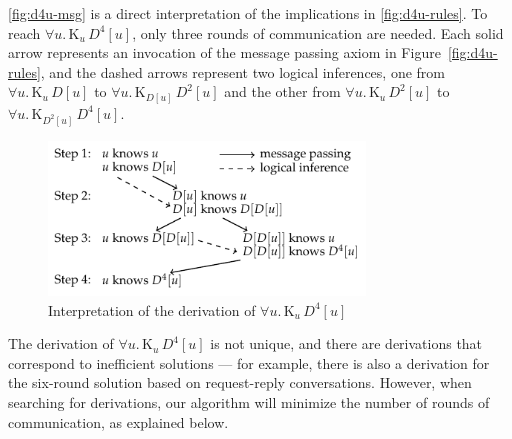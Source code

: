 \documentclass{sokendai_thesis} %
\newcommand{\knows}[2]{\mathrm K_{#1}\,{#2}}
\begin{document}
\autoref{fig:d4u-msg} is a direct interpretation of the implications in \autoref{fig:d4u-rules}.
To reach $\forall u.\,\knows{u}{D^4[u]}$, only three rounds of communication are needed.
Each solid arrow represents an invocation of the message passing axiom in Figure~\ref{fig:d4u-rules}, and the dashed arrows represent two logical inferences, one from $\forall u.\,\knows{u}{D[u]}$ to $\forall u.\,\knows{D[u]}{D^2[u]}$ and the other from $\forall u.\,\knows{u}{D^2[u]}$ to $\forall u.\,\knows{D^2[u]}{D^4[u]}$.

\begin{figure}[t]
 \centering
 \includegraphics[width=0.75\textwidth]{figures/d4u.pdf}
 \vspace{-2ex}
 \caption{Interpretation of the derivation of $\forall u.\,\knows{u}{D^4[u]}$}
 \label{fig:d4u-msg}
\end{figure}

The derivation of $\forall u.\,\knows{u}{D^4[u]}$ is not unique, and there are derivations that correspond to inefficient solutions --- for example, there is also a derivation for the six-round solution based on request-reply conversations.
However, when searching for derivations, our algorithm will minimize the number of rounds of communication, as explained below.
\end{document}
